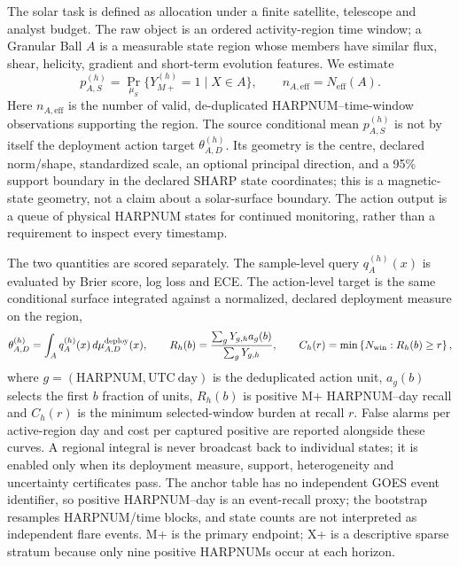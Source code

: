 \documentclass[10pt]{article}
\begin{document}
The solar task is defined as allocation under a finite satellite, telescope and analyst budget. The raw object is an ordered activity-region time window; a Granular Ball $A$ is a measurable state region whose members have similar flux, shear, helicity, gradient and short-term evolution features. We estimate
\begin{equation}
p_{A,S}^{(h)}=\Pr_{\mu_S}\{Y_{M+}^{(h)}=1\mid X\in A\},\qquad n_{A,\mathrm{eff}}=N_{\mathrm{eff}}(A).
\end{equation}
Here $n_{A,\mathrm{eff}}$ is the number of valid, de-duplicated HARPNUM--time-window observations supporting the region. The source conditional mean $p_{A,S}^{(h)}$ is not by itself the deployment action target $\theta_{A,D}^{(h)}$. Its geometry is the centre, declared norm/shape, standardized scale, an optional principal direction, and a 95\% support boundary in the declared SHARP state coordinates; this is a magnetic-state geometry, not a claim about a solar-surface boundary. The action output is a queue of physical HARPNUM states for continued monitoring, rather than a requirement to inspect every timestamp.

The two quantities are scored separately. The sample-level query $q_A^{(h)}(x)$ is evaluated by Brier score, log loss and ECE. The action-level target is the same conditional surface integrated against a normalized, declared deployment measure on the region,
\begin{equation}
\theta_{A,D}^{(h)}=\int_A q_A^{(h)}(x)\,d\mu_{A,D}^{\rm deploy}(x),\qquad
R_h(b)=\frac{\sum_gY_{g,h}a_g(b)}{\sum_gY_{g,h}},\qquad
C_h(r)=\min\left\{N_{\rm win}:R_h(b)\ge r\right\},
\end{equation}
where $g=(\mathrm{HARPNUM},\mathrm{UTC\ day})$ is the deduplicated action unit, $a_g(b)$ selects the first $b$ fraction of units, $R_h(b)$ is positive M+ HARPNUM--day recall and $C_h(r)$ is the minimum selected-window burden at recall $r$. False alarms per active-region day and cost per captured positive are reported alongside these curves. A regional integral is never broadcast back to individual states; it is enabled only when its deployment measure, support, heterogeneity and uncertainty certificates pass. The anchor table has no independent GOES event identifier, so positive HARPNUM--day is an event-recall proxy; the bootstrap resamples HARPNUM/time blocks, and state counts are not interpreted as independent flare events. M+ is the primary endpoint; X+ is a descriptive sparse stratum because only nine positive HARPNUMs occur at each horizon.
\end{document}
